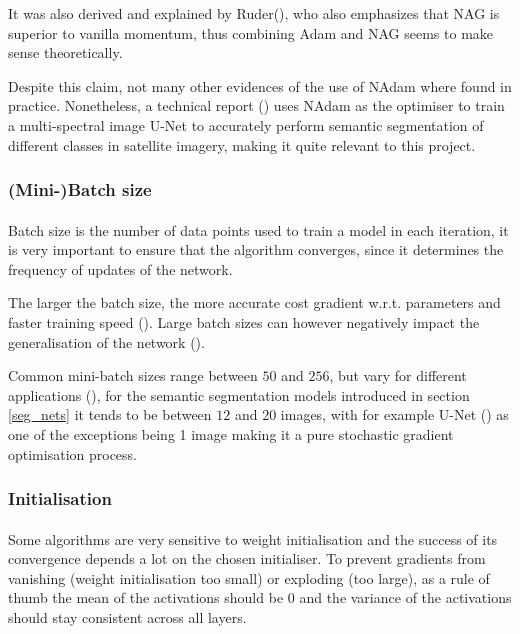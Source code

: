 It was also derived and explained by Ruder(\cite{ruder2017overview}), who also emphasizes that \gls{NAG} is superior to vanilla momentum, thus combining \gls{Adam} and NAG seems to make sense theoretically. 

Despite this claim, not many other evidences of the use of \gls{NAdam} where found in practice. Nonetheless, a technical report (\cite{DBLP:journals/corr/IglovikovMO17}) uses \gls{NAdam} as the optimiser to train a  multi-spectral image U-Net to accurately perform semantic segmentation of different classes in satellite imagery, making it quite relevant to this project.
\subsubsection{(Mini-)Batch size} \label{batch_size}
\paragraph{}
Batch size is the number of data points used to train a model in each iteration, it is very important to ensure that the algorithm converges, since it determines the frequency of updates of the network.

The larger the batch size, the more accurate cost gradient w.r.t. parameters and faster training speed (\cite{deeplearning_ai}). Large batch sizes can however negatively impact the generalisation of the network (\cite{keskar2017largebatch}).

Common mini-batch sizes range between $50$ and $256$, but vary for different applications (\cite{ruder2017overview}), for the semantic segmentation models introduced in section \ref{seg_nets} it tends to be between $12$ and $20$ images, with for example U-Net (\cite{ronneberger2015unet}) as one of the exceptions being 1 image making it a pure stochastic gradient optimisation process.
\subsubsection{Initialisation} \label{initialisation}
\paragraph{}
Some algorithms are very sensitive to weight initialisation and the success of its convergence depends a lot on the chosen initialiser. To prevent gradients from vanishing (weight initialisation too small) or exploding (too large), as a rule of thumb the mean of the activations should be $0$ and the variance of the activations should stay consistent across all layers.

